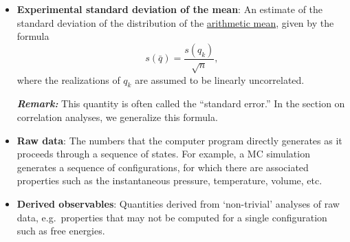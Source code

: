 \begin{itemize}
\item {\bf Experimental standard deviation of the mean}: An estimate of the standard deviation of the distribution of the \hyperref[def:arith_mean]{arithmetic mean}, given by the formula
  \begin{equation}
    s\left(\bar{q}\right) = \dfrac{s\left(q_k\right)}{\sqrt{n}}, \label{def:exp_st_dev_mean}
  \end{equation}
  where the realizations of $q_k$ are assumed to be linearly uncorrelated.
  
  

\smallskip
\textbf{\textit{Remark:}} This quantity is often called the ``standard error.''  In the section on correlation analyses, we generalize this formula.


  
\item {\bf Raw data}: The numbers that the computer program directly generates as it proceeds through a sequence of states.
For example, a MC simulation generates a sequence of configurations, for which there are associated properties such as the instantaneous pressure, temperature, volume, etc.
\label{def:raw_data}
\item {\bf Derived observables}: Quantities derived from `non-trivial' analyses of raw data, e.g.\ properties that may not be computed for a single configuration such as free energies.
  \label{def:deriv_obs}
  

\end{itemize}
